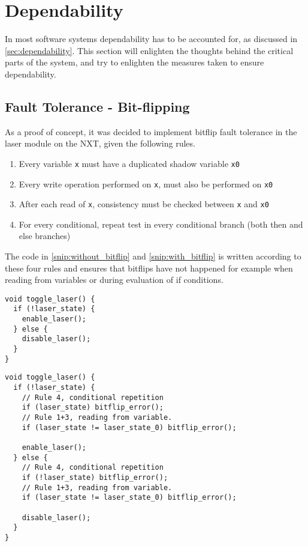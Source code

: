 \section{Dependability}\label{Design:Dependability}
In most software systems dependability has to be accounted for, as discussed in \autoref{sec:dependability}.
This section will enlighten the thoughts behind the critical parts of the system, and try to enlighten the measures taken to ensure dependability.

\subsection{Fault Tolerance - Bit-flipping}
As a proof of concept, it was decided to implement bitflip fault tolerance in the laser module on the NXT, given the following rules.

\begin{enumerate}
  \item Every variable \texttt{x} must have a duplicated shadow variable \texttt{x0}\cite{errorDetectionSoft}
  \item Every write operation performed on \texttt{x}, must also be performed on \texttt{x0}\cite{errorDetectionSoft}
  \item After each read of \texttt{x}, consistency must be checked between \texttt{x} and \texttt{x0}\cite{errorDetectionSoft}
  \item For every conditional, repeat test in every conditional branch (both then and else branches)\cite{errorDetectionSoft}
\end{enumerate}

The code in \autoref{snip:without_bitflip} and \autoref{snip:with_bitflip} is written according to these four rules and ensures that bitflips have not happened for example when reading from variables or during evaluation of if conditions.

\noindent\begin{minipage}{.45\textwidth}
\begin{lstlisting}[label={snip:without_bitflip},caption={Without~bitflip-security},frame=tlrb,numbers=none]
void toggle_laser() {
  if (!laser_state) {
    enable_laser();
  } else {
    disable_laser();
  }
}
\end{lstlisting}
\end{minipage}\hfill
\begin{minipage}{.45\textwidth}
\begin{lstlisting}[label={snip:with_bitflip},caption={With bitflip-security},frame=tlrb,numbers=none]
void toggle_laser() {
  if (!laser_state) {
    // Rule 4, conditional repetition
    if (laser_state) bitflip_error();
    // Rule 1+3, reading from variable.
    if (laser_state != laser_state_0) bitflip_error();

    enable_laser();
  } else {
    // Rule 4, conditional repetition
    if (!laser_state) bitflip_error();
    // Rule 1+3, reading from variable.
    if (laser_state != laser_state_0) bitflip_error();

    disable_laser();
  }
}
\end{lstlisting}
\end{minipage}

